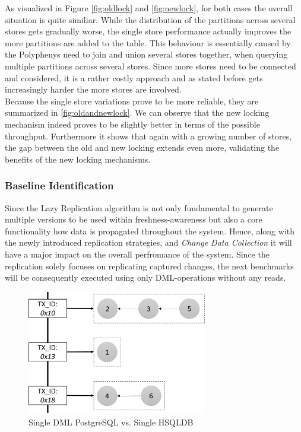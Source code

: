 As visualized in Figure \ref{fig:oldlock} and \ref{fig:newlock}, for both cases the overall situation is quite similiar.
While the distribution of the partitions across several stores gets gradually worse, the single store performance actually improves the more partitions are added to the table.
This behaviour is essentially caused by the Polyphenys need to join and union several stores together, when querying multiple partitions across several stores.
Since more stores need to be connected and considered, it is a rather costly approach and as stated before gets increasingly harder the more stores are involved.\\

Because the single store variations prove to be more reliable, they are summarized in \ref{fig:oldandnewlock}.
We can observe that the new locking mechanism indeed proves to be slightly better in terms of the possible throughput.
Furthermore it shows that again with a growing number of stores, the gap between the old and new locking extends even more, validating the benefits of the new locking mechanisms.






\subsubsection{Baseline Identification} 


Since the Lazy Replication algorithm is not only fundamental to generate multiple versions to be used within freshness-awareness
but also a core functionality how data is propagated throughout the system. 
Hence, along with the newly introduced replication strategies, and \emph{Change Data Collection} it will have a major impact on the overall perfromance of the system.
Since the replication solely focuses on replicating captured changes, the next benchmarks will be consequently executed using only DML-operations without any reads.\\

\begin{figure}[t] 
    \centering 
    \includegraphics[width=0.7\textwidth]{Figures/store_comparision.png}
    \caption{Single DML PostgreSQL vs. Single HSQLDB}
    \label{fig:singlepsqlhsql}
\end{figure}

